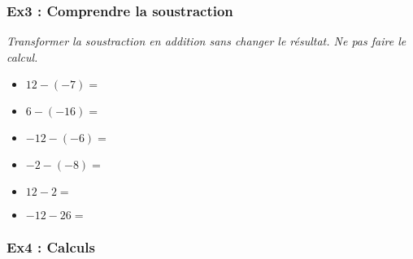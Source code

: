 \subsubsection*{Ex3 : Comprendre la soustraction}

\textit{Transformer la soustraction en addition sans changer le résultat. Ne pas faire le calcul.}

\begin{multicols}{3}

\begin{itemize}[label={$\bullet$}]
  \item $12 - (-7) = $ \dotfill
  \item $6 - (-16) = $ \dotfill
  \item $-12 - (-6) = $ \dotfill
  \item $-2 - (-8) = $ \dotfill
  \item $12 - 2 = $ \dotfill
  \item $-12 - 26 = $ \dotfill
\end{itemize}

\end{multicols}

\subsubsection*{Ex4 : Calculs}

